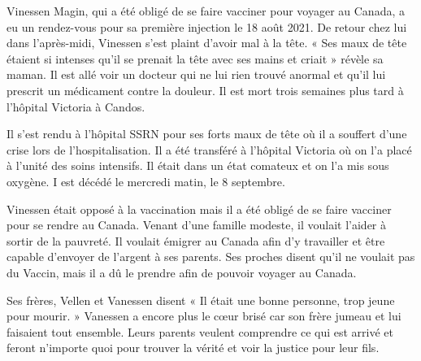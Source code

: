Vinessen Magin, qui a été obligé de se faire vacciner pour voyager au Canada, a
eu un rendez-vous pour sa première injection le 18 août 2021. De retour chez lui
dans l’après-midi, Vinessen s’est plaint d’avoir mal à la tête. « Ses maux de
tête étaient si intenses qu’il se prenait la tête avec ses mains et criait »
révèle sa maman. Il est allé voir un docteur qui ne lui rien trouvé anormal et
qu’il lui prescrit un médicament contre la douleur. Il est mort trois semaines
plus tard à l’hôpital Victoria à Candos.

Il s’est rendu à l’hôpital SSRN pour ses forts maux de tête où il a souffert
d’une crise lors de l’hospitalisation. Il a été transféré à l’hôpital Victoria
où on l’a placé à l’unité des soins intensifs. Il était dans un état comateux et
on l’a mis sous oxygène. I est décédé le mercredi matin, le 8 septembre.

Vinessen était opposé à la vaccination mais il a été obligé de se faire vacciner
pour se rendre au Canada. Venant d’une famille modeste, il voulait l’aider à
sortir de la pauvreté. Il voulait émigrer au Canada afin d’y travailler et être
capable d’envoyer de l’argent à ses parents. Ses proches disent qu’il ne voulait
pas du Vaccin, mais il a dû le prendre afin de pouvoir voyager au Canada.

Ses frères, Vellen et Vanessen disent « Il était une bonne personne, trop jeune
pour mourir. » Vanessen a encore plus le cœur brisé car son frère jumeau et lui
faisaient tout ensemble. Leurs parents veulent comprendre ce qui est arrivé et
feront n’importe quoi pour trouver la vérité et voir la justice pour leur fils.

